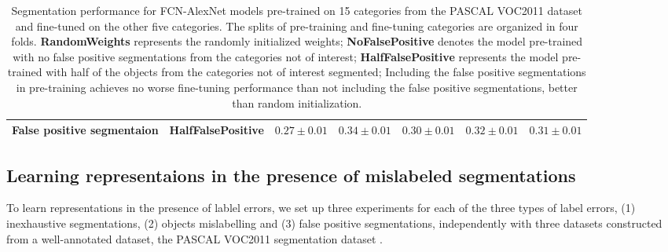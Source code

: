 \begin{table}[t]
{\begin{tabular}{l|c|cccc|c}
False positive segmentaion                                                      & HalfFalsePositive                                                  & \multicolumn{1}{l}{$0.27\pm0.01$}                                                                       & \multicolumn{1}{l}{$0.34\pm0.01$}                                                           & \multicolumn{1}{l}{$0.30\pm0.01$}                                                                              & \multicolumn{1}{l|}{$0.32\pm0.01$}                                                                      & $\mathbf{0.31\pm0.01}$                                                                                                 \\ \hline

\end{tabular}
}
\caption{
Segmentation performance for FCN-AlexNet models pre-trained on 15 categories from the PASCAL VOC2011 dataset and fine-tuned on the other five categories.
The splits of pre-training and fine-tuning categories are organized in four folds.
\textbf{RandomWeights} represents the randomly initialized weights;
\textbf{NoFalsePositive} denotes the model pre-trained with no false positive segmentations from the categories not of interest;
\textbf{HalfFalsePositive} represents the model pre-trained with half of the objects from the categories not of interest segmented;
Including the false positive segmentations in pre-training achieves no worse fine-tuning performance than not including the false positive segmentations, better than random initialization.
}
\label{tab:falsepos}
\end{table}


\subsection{Learning representaions in the presence of mislabeled segmentations}
\label{subsec:robustness}


To learn representations in the presence of lablel errors, we set up three experiments for each of the three types of label errors, (1) inexhaustive segmentations, (2) objects mislabelling and (3) false positive segmentations, independently with three datasets constructed from a well-annotated dataset, the PASCAL VOC2011 segmentation dataset \cite{everingham2015pascal}.


